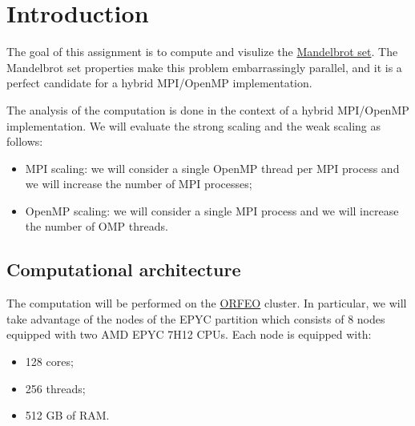 \section{Introduction}

The goal of this assignment is to compute and visulize the \href{https://en.wikipedia.org/wiki/Mandelbrot_set}{Mandelbrot set}. The Mandelbrot set properties make this problem embarrassingly parallel, and it is a perfect candidate for a hybrid MPI/OpenMP implementation.

The analysis of the computation is done in the context of a hybrid MPI/OpenMP implementation. We will evaluate the strong scaling and the weak scaling as follows:
\begin{itemize}
    \item MPI scaling: we will consider a single OpenMP thread per MPI process and we will increase the number of MPI processes;
    \item OpenMP scaling: we will consider a single MPI process and we will increase the number of OMP threads.
\end{itemize}

\subsection{Computational architecture}

The computation will be performed on the \href{https://orfeo-doc.areasciencepark.it/}{ORFEO} cluster. In particular, we will take advantage of the nodes of the EPYC partition which consists of 8 nodes equipped with two AMD EPYC 7H12 CPUs. Each node is equipped with: 
\begin{itemize}
    \item 128 cores;
    \item 256 threads;
    \item 512 GB of RAM.
\end{itemize}





